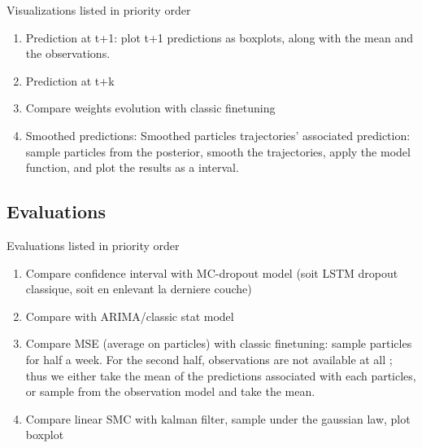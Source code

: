 \documentclass{article}
\begin{document}
Visualizations listed in priority order
\begin{enumerate}
	\item Prediction at t+1: plot t+1 predictions as boxplots, along with the mean and the observations.
	\item Prediction at t+k
	\item Compare weights evolution with classic finetuning
	\item Smoothed predictions: Smoothed particles trajectories' associated prediction: sample particles from the posterior, smooth the trajectories, apply the model function, and plot the results as a interval.
\end{enumerate}

\subsection{Evaluations}%
\label{sub:evaluations}

Evaluations listed in priority order
\begin{enumerate}
	\item Compare confidence interval with MC-dropout model (soit LSTM dropout classique, soit en enlevant la derniere couche)
	\item Compare with ARIMA/classic stat model
	\item Compare MSE (average on particles) with classic finetuning: sample particles for half a week. For the second half, observations are not available at all ; thus we either take the mean of the predictions associated with each particles, or sample from the observation model and take the mean.
	\item Compare linear SMC with kalman filter, sample under the gaussian law, plot boxplot
\end{enumerate}



\end{document}
